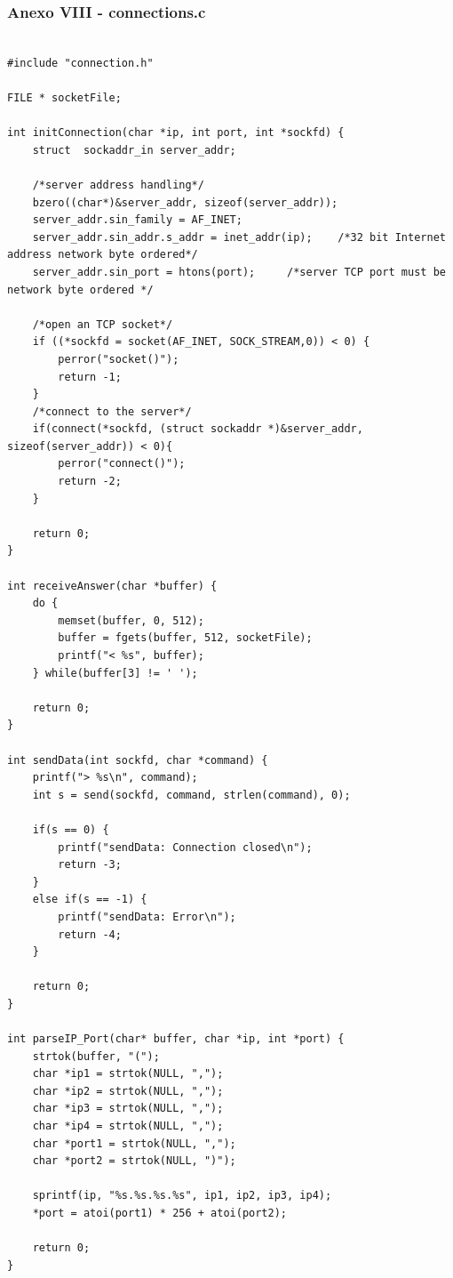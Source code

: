 \documentclass[11pt]{article}
\begin{document}
\subsubsection{Anexo VIII - connections.c}

\begin{lstlisting}[style=CStyle]

#include "connection.h"

FILE * socketFile;

int initConnection(char *ip, int port, int *sockfd) {
    struct	sockaddr_in server_addr;

    /*server address handling*/
	bzero((char*)&server_addr, sizeof(server_addr));
	server_addr.sin_family = AF_INET;
	server_addr.sin_addr.s_addr = inet_addr(ip);	/*32 bit Internet address network byte ordered*/
	server_addr.sin_port = htons(port);		/*server TCP port must be network byte ordered */
    
	/*open an TCP socket*/
	if ((*sockfd = socket(AF_INET, SOCK_STREAM,0)) < 0) {
        perror("socket()");
        return -1;
    }
	/*connect to the server*/
    if(connect(*sockfd, (struct sockaddr *)&server_addr, sizeof(server_addr)) < 0){
        perror("connect()");
        return -2;
	}

    return 0;
}

int receiveAnswer(char *buffer) {
    do {
        memset(buffer, 0, 512);
        buffer = fgets(buffer, 512, socketFile);
        printf("< %s", buffer);
    } while(buffer[3] != ' ');

    return 0;
}

int sendData(int sockfd, char *command) {
    printf("> %s\n", command);
    int s = send(sockfd, command, strlen(command), 0);

    if(s == 0) {
        printf("sendData: Connection closed\n");
        return -3;
    }
    else if(s == -1) {
        printf("sendData: Error\n");
        return -4;
    }

    return 0;
}

int parseIP_Port(char* buffer, char *ip, int *port) {
    strtok(buffer, "(");
    char *ip1 = strtok(NULL, ",");
    char *ip2 = strtok(NULL, ",");
    char *ip3 = strtok(NULL, ",");
    char *ip4 = strtok(NULL, ",");
    char *port1 = strtok(NULL, ",");
    char *port2 = strtok(NULL, ")");

    sprintf(ip, "%s.%s.%s.%s", ip1, ip2, ip3, ip4);
    *port = atoi(port1) * 256 + atoi(port2);

    return 0;
}


\end{lstlisting}
\end{document}

